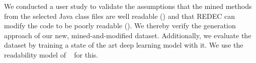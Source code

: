 \documentclass[%
class=scrreprt,
chapterprefix=false,%
open=right,%
twoside=false,%
paper=a4,%
logofile={Logo\_zentral\_farbig\_EN.png},%
thesistype=master,%
UKenglish,%
]{se2thesis}
\newcounter{urlfootnote}
\newcommand{\onecurl}[2]{%
	\stepcounter{urlfootnote}%
	\expandafter\def\csname urlfootnote:#1\endcsname{\theurlfootnote}%
	\footnote{\label{url:#1}\url{#1}, accessed: #2}%
}
\newcommand{\curl}[2]{%
	\ifcsdef{urlfootnote:#1}{%
		\textsuperscript{\ref{url:#1}}%
	}{%
		\onecurl{#1}{#2}%
	}%
}
\theoremstyle{definition}
\newcommand{\citeolddataset}{\cite{buse2009learning, dorn2012general, scalabrino2018comprehensive}\xspace}
\newcommand{\rdh}{REDEC\xspace}
\begin{document}
%	

	We conducted a user study to validate the assumptions that the mined methods from the selected Java class files are well readable () and that \rdh can modify the code to be poorly readable (). We thereby verify the generation approach of our new, mined-and-modified dataset.
	Additionally, we evaluate the dataset by training a state of the art deep learning model with it. We use the readability model of \citeauthor{mi2022towards}~\cite{mi2022towards} for this.
		
\end{document}

